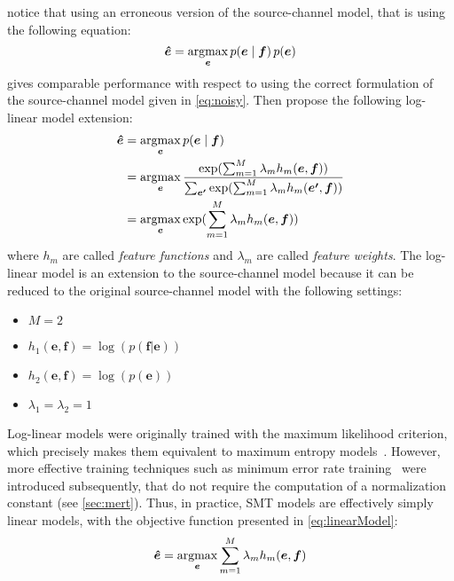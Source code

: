 
\citet{och-tillmann-ney:1999:EMNLP} notice that using an erroneous
version of the source-channel model, that is using the following equation:
%
\begin{equation}
  \bm{\hat{e}} = \operatorname*{argmax}_{\bm{e}} p(\bm{e} \mid \bm{f}) \, p(\bm{e})
\end{equation}
%
gives comparable performance with respect to using the correct
formulation of the source-channel model given in \autoref{eq:noisy}.
Then \citet{och-ney:2002:ACL} propose the following log-linear model extension:
%
\begin{align}
  \bm{\hat{e}} &= \operatorname*{argmax}_{\bm{e}} p(\bm{e} \mid \bm{f}) \nonumber \\
               &= \operatorname*{argmax}_{\bm{e}} \frac{\exp(\sum_{m=1}^M \lambda_m h_m(\bm{e}, \bm{f}))}{\sum_{\bm{e'}}\exp(\sum_{m=1}^M \lambda_m h_m(\bm{e'}, \bm{f}))} \nonumber \\
               &= \operatorname*{argmax}_{\bm{e}} \exp(\sum_{m=1}^M \lambda_m h_m(\bm{e}, \bm{f})) \label{eq:loglinearModel}
\end{align}
%
where $h_m$ are called \emph{feature functions} and $\lambda_m$
are called \emph{feature weights}. The log-linear model is an extension
to the source-channel model because it can be reduced to the original
source-channel model with the following settings:
%
    \begin{itemize}
      \item $M = 2$
      \item $h_1(\bm{e}, \bm{f}) = \log (p(\bm{f}|\bm{e}))$
      \item $h_2(\bm{e}, \bm{f}) = \log (p(\bm{e}))$
      \item $\lambda_1 = \lambda_2 = 1$
    \end{itemize}
%
Log-linear models were originally trained with the maximum likelihood
criterion, which precisely makes them equivalent to maximum entropy
models~\citep{berger-dellapietra-dellapietra:1996:CL}. However,
more effective training techniques such as minimum error rate
training~\citep{och:2003:ACL} were introduced subsequently, that do
not require the computation of a normalization constant
(see \autoref{sec:mert}).
Thus, in practice, SMT models are effectively simply linear models, with the objective
function presented in \autoref{eq:linearModel}:
%
\begin{equation}
  \bm{\hat{e}} = \operatorname*{argmax}_{\bm{e}} \sum_{m=1}^M \lambda_m h_m(\bm{e}, \bm{f})
  \label{eq:linearModel}
\end{equation}


